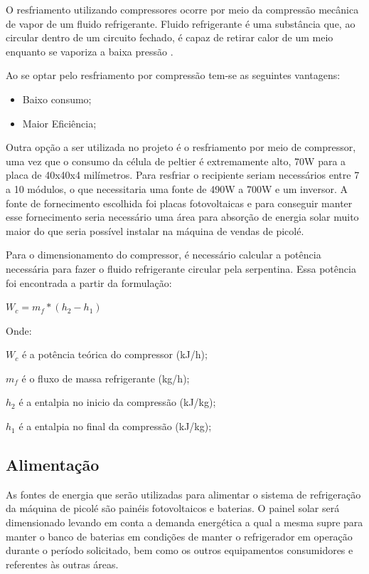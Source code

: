 O resfriamento utilizando compressores ocorre por meio da compressão mecânica de vapor de um fluido refrigerante. Fluido refrigerante é uma substância que, ao circular dentro de um circuito fechado, é capaz de retirar calor de um meio enquanto se vaporiza a baixa pressão \cite{teixeiraconcepccao}.

Ao se optar pelo resfriamento por compressão tem-se as seguintes vantagens:

\begin{itemize}
\item Baixo consumo;

\item Maior Eficiência;
\end{itemize}


Outra opção a ser utilizada no projeto é o resfriamento por meio de compressor, uma vez que o consumo da célula de peltier é extremamente alto, 70W para a placa de 40x40x4 milímetros. Para resfriar o recipiente seriam necessários entre 7 a 10 módulos, o que necessitaria uma fonte de 490W a 700W e um inversor. A fonte de fornecimento escolhida foi placas fotovoltaicas e para conseguir manter esse fornecimento seria necessário uma área para absorção de energia solar muito maior do que seria possível instalar na máquina de vendas de picolé. 


Para o dimensionamento do compressor, é necessário calcular a potência necessária para fazer o fluido refrigerante circular pela serpentina. Essa potência foi encontrada a
partir da formulação:

\begin{math} W_{c} = m_{f} * (h_{2} - h_{1})  \end{math}

Onde:

$W_{c}$ é a potência teórica do compressor (kJ/h);

$m_{f}$ é o fluxo de massa refrigerante (kg/h);

$h_{2}$ é a entalpia no inicio da compressão (kJ/kg);

$h_{1}$ é a entalpia no final da compressão (kJ/kg);


\subsection{Alimentação}
	As fontes de energia que serão utilizadas para alimentar o sistema de refrigeração da máquina de picolé são painéis fotovoltaicos e baterias. O painel solar será dimensionado levando em conta a demanda energética a qual a mesma supre para manter o banco de baterias em condições de manter o refrigerador em operação durante o período solicitado, bem como os outros equipamentos consumidores e referentes às outras áreas.
    
